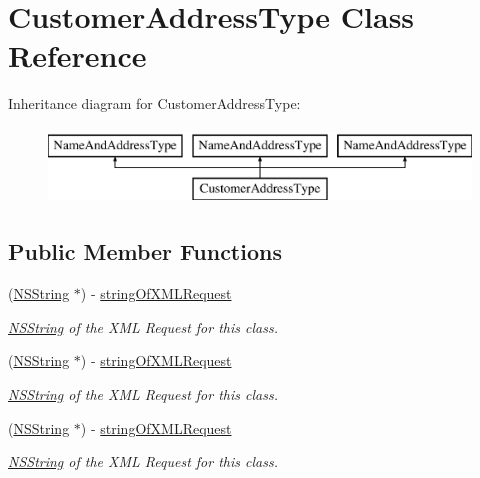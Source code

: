 \hypertarget{interface_customer_address_type}{
\section{CustomerAddressType Class Reference}
\label{interface_customer_address_type}
}
Inheritance diagram for CustomerAddressType:\begin{figure}[H]
\begin{center}
\leavevmode
\includegraphics[height=2.000000cm]{interface_customer_address_type}
\end{center}
\end{figure}
\subsection*{Public Member Functions}
\begin{DoxyCompactItemize}
\item 
(\hyperlink{class_n_s_string}{NSString} $\ast$) -\/ \hyperlink{interface_customer_address_type_a556f026b6a303c3656cc9056200e3b9d}{stringOfXMLRequest}
\begin{DoxyCompactList}\small\item\em \hyperlink{class_n_s_string}{NSString} of the XML Request for this class. \item\end{DoxyCompactList}\item 
(\hyperlink{class_n_s_string}{NSString} $\ast$) -\/ \hyperlink{interface_customer_address_type_a556f026b6a303c3656cc9056200e3b9d}{stringOfXMLRequest}
\begin{DoxyCompactList}\small\item\em \hyperlink{class_n_s_string}{NSString} of the XML Request for this class. \item\end{DoxyCompactList}\item 
(\hyperlink{class_n_s_string}{NSString} $\ast$) -\/ \hyperlink{interface_customer_address_type_a556f026b6a303c3656cc9056200e3b9d}{stringOfXMLRequest}
\begin{DoxyCompactList}\small\item\em \hyperlink{class_n_s_string}{NSString} of the XML Request for this class. \item\end{DoxyCompactList}\end{DoxyCompactItemize}
